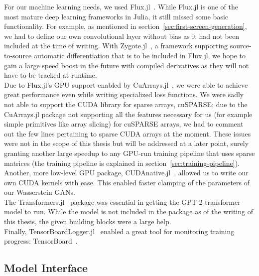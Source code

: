 For our machine learning needs, we used
\mbox{Flux.jl}~\cite{FluxMLFluxJl2019}. While \mbox{Flux.jl} is one of
the most mature deep learning frameworks in Julia, it still missed
some basic functionality. For example, as mentioned in
section~\ref{sec:first-screen-generation}, we had to define our own
convolutional layer without bias as it had not been included at the
time of writing. With \mbox{Zygote.jl}~\cite{FluxMLZygoteJl2019}, a
framework supporting source-to-source automatic differentiation that
is to be included in \mbox{Flux.jl}, we hope to gain a large speed
boost in the future with compiled derivatives as they will not have to
be tracked at runtime. \\
Due to \mbox{Flux.jl}'s GPU support enabled by
\mbox{CuArrays.jl}~\cite{JuliaGPUCuArraysJl2019}, we were able to
achieve great performance even while writing specialized loss
functions. We were sadly not able to support the CUDA library for
sparse arrays, \mbox{cuSPARSE}; due to the \mbox{CuArrays.jl} package
not supporting all the features necessary for us (for example simple
primitives like array slicing) for \mbox{cuSPARSE} arrays, we had to
comment out the few lines pertaining to sparse CUDA arrays at the
moment. These issues were not in the scope of this thesis but will be
addressed at a later point, surely granting another large speedup to
any GPU-run training pipeline that uses sparse matrices (the training
pipeline is explained in section~\ref{sec:training-pipeline}).
Another, more low-level GPU package,
\mbox{CUDAnative.jl}~\cite{JuliaGPUCUDAnativeJl2019}, allowed us to
write our own CUDA kernels with ease. This enabled faster clamping of
the parameters of our Wasserstein GANs. \\
The \mbox{Transformers.jl}~\cite{peterChengchingwenTransformersJl2019}
package was essential in getting the \mbox{GPT-2} transformer model to
run. While the model is not included in the package as of the writing
of this thesis, the given building blocks were a large help. \\
Finally,
\mbox{TensorBoardLogger.jl}~\cite{vicentiniPhilipVincTensorBoardLoggerJl2019}
enabled a great tool for monitoring training progress:
TensorBoard~\cite{TensorBoard}.

\subsection{Model Interface}
\label{sec:model-interface}

